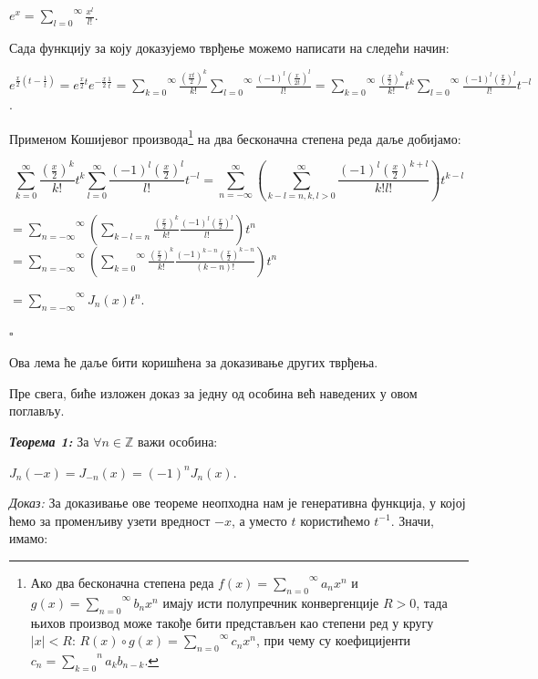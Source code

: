 \(e^{x} = \overset{\infty}{\sum_{l = 0}}\frac{x^{l}}{l!}\).

Сада функцију за коју доказујемо тврђење можемо написати на следећи
начин:

\(e^{\frac{x}{2}(t - \frac{1}{t})} = e^{\frac{x}{2}t}e^{- \frac{x}{2}\frac{1}{t}} = \overset{\infty}{\sum_{k = 0}}\frac{\left( \frac{xt}{2} \right)^{k}}{k!}\overset{\infty}{\sum_{l = 0}}\frac{{( - 1)}^{l}\left( \frac{x}{2t} \right)^{l}}{l!} = \overset{\infty}{\sum_{k = 0}}\frac{\left( \frac{x}{2} \right)^{k}}{k!}t^{k}\overset{\infty}{\sum_{l = 0}}\frac{{( - 1)}^{l}\left( \frac{x}{2} \right)^{l}}{l!}t^{- l}\).

Применом Кошијевог производа\footnote{Ако два бесконачна степена реда
  \(f(x) = \overset{\infty}{\sum_{n = 0}}a_{n}x^{n}\) и
  \(g(x) = \overset{\infty}{\sum_{n = 0}}b_{n}x^{n}\) имају исти
  полупречник конвергенције \(R > 0\), тада њихов производ може такође
  бити представљен као степени ред у кругу \(|x| < R\):
  \(R(x) \circ g(x) = \overset{\infty}{\sum_{n = 0}}c_{n}x^{n}\), при
  чему су коефицијенти
  \(c_{n} = \overset{n}{\sum_{k = 0}}a_{k}b_{n - k}\).} на два
бесконачна степена реда даље добијамо:

\[\overset{\infty}{\sum_{k = 0}}\frac{\left( \frac{x}{2} \right)^{k}}{k!}t^{k}\overset{\infty}{\sum_{l = 0}}\frac{{( - 1)}^{l}\left( \frac{x}{2} \right)^{l}}{l!}t^{- l} = \overset{\infty}{\sum_{n = - \infty}}(\overset{\infty}{\sum_{k - l = n,k,l > 0}}\frac{{( - 1)}^{l}\left( \frac{x}{2} \right)^{k + l}}{k!l!})t^{k - l}\]

\(= \overset{\infty}{\sum_{n = - \infty}}(\sum_{k - l = n}\frac{\left( \frac{x}{2} \right)^{k}}{k!}\frac{{( - 1)}^{l}\left( \frac{x}{2} \right)^{l}}{l!})t^{n}\)
\(= \overset{\infty}{\sum_{n = - \infty}}(\overset{\infty}{\sum_{k = 0}}\frac{\left( \frac{x}{2} \right)^{k}}{k!}\frac{{( - 1)}^{k - n}\left( \frac{x}{2} \right)^{k - n}}{(k - n)!})t^{n}\)

\(= \overset{\infty}{\sum_{n = - \infty}}J_{n}(x)t^{n}\).

\(\square\)

Ова лема ће даље бити коришћена за доказивање других тврђења.

Пре свега, биће изложен доказ за једну од особина већ наведених у овом
поглављу.

\emph{\textbf{Теорема 1:}} За \(\forall n\mathbb{\in Z}\) важи особина:

\(J_{n}( - x) = J_{- n}(x) = {( - 1)}^{n}J_{n}(x)\).

\emph{Доказ:} За доказивање ове теореме неопходна нам је генеративна
функција, у којој ћемо за променљиву узети вредност \(- x\), а уместо
\(t\) користићемо \(t^{- 1}\). Значи, имамо:

